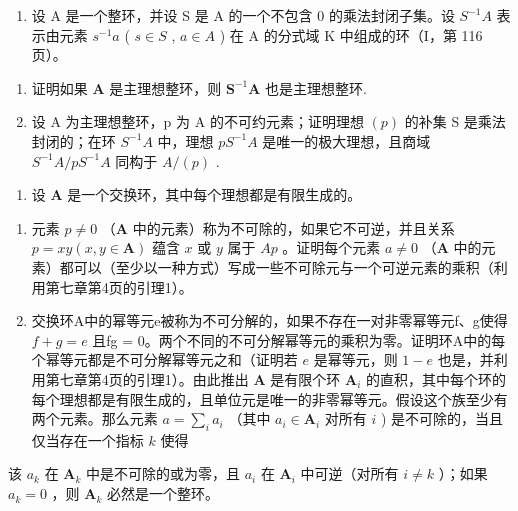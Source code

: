 \begin{enumerate}
\def\labelenumi{\arabic{enumi})}
\setcounter{enumi}{3}
\tightlist
\item
  设 A 是一个整环，并设 S 是 A 的一个不包含 0 的乘法封闭子集。设 \(S^{-1}A\) 表示由元素 \(s^{-1}a\) ( \(s \in S\) , \(a \in A\) ) 在 A 的分式域 K 中组成的环（I，第 116 页）。
\end{enumerate}

\begin{enumerate}
\def\labelenumi{\alph{enumi})}
\item
  证明如果 \(\mathbf{A}\) 是主理想整环，则 \(\mathbf{S}^{-1}\mathbf{A}\) 也是主理想整环.
\item
  设 A 为主理想整环，p 为 A 的不可约元素；证明理想 \((p)\) 的补集 S 是乘法封闭的；在环 \(S^{-1}A\) 中，理想 \(pS^{-1}A\) 是唯一的极大理想，且商域 \(S^{-1}A/pS^{-1}A\) 同构于 \(A/(p)\) .
\end{enumerate}

\begin{enumerate}
\def\labelenumi{\arabic{enumi})}
\setcounter{enumi}{4}
\tightlist
\item
  设 \(\mathbf{A}\) 是一个交换环，其中每个理想都是有限生成的。
\end{enumerate}

\begin{enumerate}
\def\labelenumi{\alph{enumi})}
\item
  元素 \(p \neq 0\) （\(\mathbf{A}\) 中的元素）称为不可除的，如果它不可逆，并且关系 \(p = xy (x, y \in \mathbf{A})\) 蕴含 \(x\) 或 \(y\) 属于 \(A p\) 。证明每个元素 \(a \neq 0\) （\(\mathbf{A}\) 中的元素）都可以（至少以一种方式）写成一些不可除元与一个可逆元素的乘积（利用第七章第4页的引理1）。
\item
  交换环A中的幂等元e被称为不可分解的，如果不存在一对非零幂等元f、g使得 \(f + g = e\) 且fg = 0。两个不同的不可分解幂等元的乘积为零。证明环A中的每个幂等元都是不可分解幂等元之和（证明若 \(e\) 是幂等元，则 \(1 - e\) 也是，并利用第七章第4页的引理1）。由此推出 \(\mathbf{A}\) 是有限个环 \(\mathbf{A}_i\) 的直积，其中每个环的每个理想都是有限生成的，且单位元是唯一的非零幂等元。假设这个族至少有两个元素。那么元素 \(a = \sum_{i} a_i\) （其中 \(a_i \in \mathbf{A}_i\) 对所有 \(i\) ) 是不可除的，当且仅当存在一个指标 \(k\) 使得
\end{enumerate}

该 \(a_{k}\) 在 \(\mathbf{A}_{k}\) 中是不可除的或为零，且 \(a_{i}\) 在 \(\mathbf{A}_{i}\) 中可逆（对所有 \(i \neq k\) ）；如果 \(a_{k} = 0\) ，则 \(\mathbf{A}_{k}\) 必然是一个整环。

